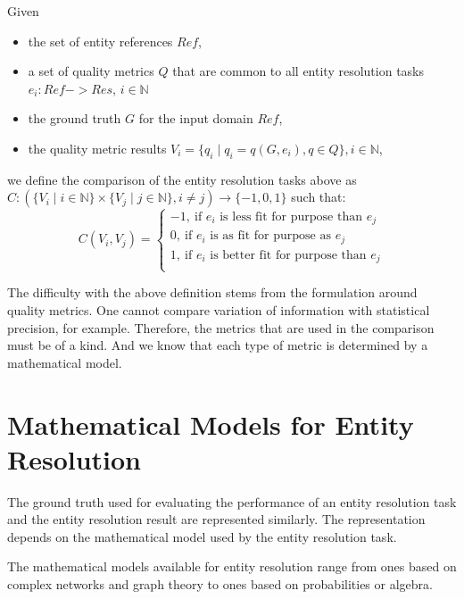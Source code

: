\documentclass[11pt]{article}
\begin{document}
    \begin{defn}
        Given
        \begin{itemize}
            \item the set of entity references $Ref$,
            \item a set of quality metrics $Q$ that are common to all
            entity resolution tasks $e_i : Ref -> Res$, $i \in \mathbb{N}$
            \item the ground truth $G$ for the input domain $Ref$,
            \item the quality metric results
            $V_i=\{q_{i} \mid q_{i} = q(G, e_i), q \in Q\}, i \in \mathbb{N}$,
        \end{itemize}   
        we define the comparison of the entity resolution tasks above as
        $C : (
            \{V_i \mid i \in \mathbb{N}\}
            \times
            \{V_j \mid j \in \mathbb{N}\},
            i \neq j
        ) \rightarrow \{-1, 0, 1\}$ such that:
        \[ 
C(V_i, V_j) = \left\{
\begin{array}{ll}
      -1,~\textrm{if $e_i$ is less fit for purpose than $e_j$}\\
      0,~\textrm{if $e_i$ is as fit for purpose as $e_j$}\\
      1,~\textrm{if $e_i$ is better fit for purpose than $e_j$}\\
\end{array} 
\right. 
\]

    \end{defn}

    The difficulty with the above definition stems from the formulation around
    quality metrics.
    One cannot compare variation of information with statistical precision, for
    example.
    Therefore, the metrics that are used in the comparison must be of a kind.
    And we know that each type of metric is determined by a mathematical model.
    
    \section[mm]{Mathematical Models for Entity Resolution}\label{sec:mm}

    The ground truth used for evaluating the performance of an entity resolution
    task and the entity resolution result are represented similarly.
    The representation depends on the mathematical model used by the entity
    resolution task.
    
    The mathematical models available for entity resolution range from ones
    based on complex networks and graph theory\cite{Li2020} to ones based on
    probabilities\cite{fs1969} or algebra\cite{Tal11,Ben2009Swoosh}.
\end{document}
